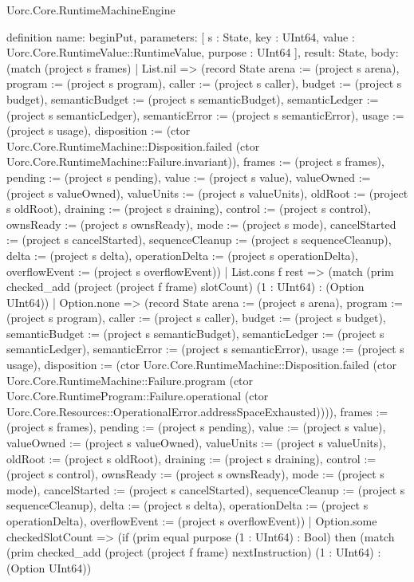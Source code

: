\begin{lexlean}{Uorc.Core.RuntimeMachineEngine}
\begin{semanticmodule}
definition{
  name: beginPut,
  parameters: [
    s : State,
    key : UInt64,
    value : Uorc.Core.RuntimeValue::RuntimeValue,
    purpose : UInt64
  ],
  result: State,
  body: (match (project s frames)
    | List.nil => (record State {arena := (project s arena), program := (project s program), caller := (project s caller), budget := (project s budget), semanticBudget := (project s semanticBudget), semanticLedger := (project s semanticLedger), semanticError := (project s semanticError), usage := (project s usage), disposition := (ctor Uorc.Core.RuntimeMachine::Disposition.failed (ctor Uorc.Core.RuntimeMachine::Failure.invariant)), frames := (project s frames), pending := (project s pending), value := (project s value), valueOwned := (project s valueOwned), valueUnits := (project s valueUnits), oldRoot := (project s oldRoot), draining := (project s draining), control := (project s control), ownsReady := (project s ownsReady), mode := (project s mode), cancelStarted := (project s cancelStarted), sequenceCleanup := (project s sequenceCleanup), delta := (project s delta), operationDelta := (project s operationDelta), overflowEvent := (project s overflowEvent)})
    | List.cons f rest => (match (prim checked_add (project (project f frame) slotCount) (1 : UInt64) : (Option UInt64))
      | Option.none => (record State {arena := (project s arena), program := (project s program), caller := (project s caller), budget := (project s budget), semanticBudget := (project s semanticBudget), semanticLedger := (project s semanticLedger), semanticError := (project s semanticError), usage := (project s usage), disposition := (ctor Uorc.Core.RuntimeMachine::Disposition.failed (ctor Uorc.Core.RuntimeMachine::Failure.program (ctor Uorc.Core.RuntimeProgram::Failure.operational (ctor Uorc.Core.Resources::OperationalError.addressSpaceExhausted)))), frames := (project s frames), pending := (project s pending), value := (project s value), valueOwned := (project s valueOwned), valueUnits := (project s valueUnits), oldRoot := (project s oldRoot), draining := (project s draining), control := (project s control), ownsReady := (project s ownsReady), mode := (project s mode), cancelStarted := (project s cancelStarted), sequenceCleanup := (project s sequenceCleanup), delta := (project s delta), operationDelta := (project s operationDelta), overflowEvent := (project s overflowEvent)})
      | Option.some checkedSlotCount => (if (prim equal purpose (1 : UInt64) : Bool) then (match (prim checked_add (project (project f frame) nextInstruction) (1 : UInt64) : (Option UInt64))
}
\end{semanticmodule}
\end{lexlean}

